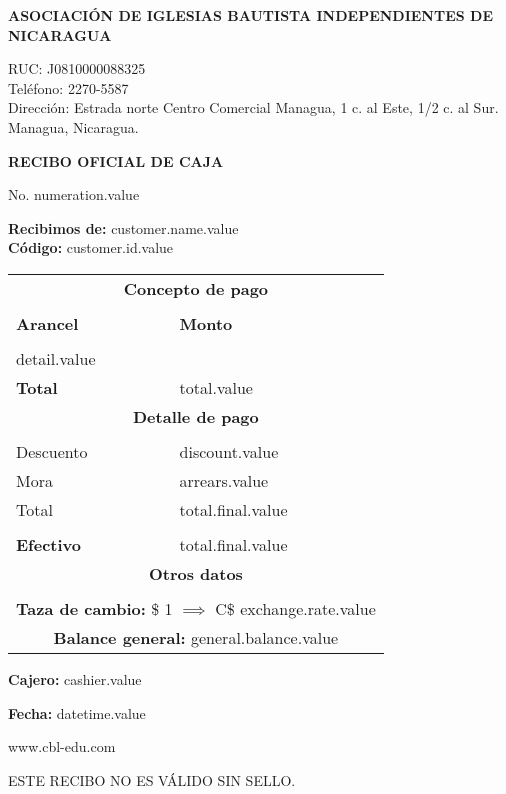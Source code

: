 \documentclass[11pt]{article}
\newcommand{\thenumber}{numeration.value}
\newcommand{\customerName}{customer.name.value}
\newcommand{\customerId}{customer.id.value}
\newcommand{\detail}{detail.value}
\newcommand{\total}{total.value}
\newcommand{\discountTotal}{discount.value}
\newcommand{\arrearsTotal}{arrears.value}
\newcommand{\finalTotal}{total.final.value}
\newcommand{\cashier}{cashier.value}
\newcommand{\datetime}{datetime.value}
\newcommand{\exchangeRate}{exchange.rate.value}
\newcommand{\generalBalance}{general.balance.value}
\begin{document}
    \begin{center}
        \textbf{ASOCIACIÓN DE IGLESIAS BAUTISTA INDEPENDIENTES DE NICARAGUA}\par
        {
            \small
            RUC: J0810000088325\\
            Teléfono: 2270-5587\\
            Dirección: Estrada norte Centro Comercial Managua, 1 c. al Este, 1/2 c. al Sur. Managua, Nicaragua.\par
        }
        \textbf{RECIBO OFICIAL DE CAJA}\par
        No. \thenumber
    \end{center}
    \textbf{Recibimos de:} \customerName\\
    \textbf{Código:} \customerId

    \begin{longtable}{p{3.8cm} p{1.8cm}}
        \hline
        \multicolumn{2}{c}{\textbf{Concepto de pago}} \\\\
        \textbf{Arancel} & \textbf{Monto} \\\\
        \detail\\
        \textbf{Total} & \total\\
        \hline
        \multicolumn{2}{c}{\textbf{Detalle de pago}} \\\\
        Descuento & \discountTotal\\
        Mora & \arrearsTotal\\
        Total & \finalTotal\\\\
        \textbf{Efectivo} & \finalTotal\\
        \hline
        \multicolumn{2}{c}{\textbf{Otros datos}}\\\\
        \multicolumn{2}{c}{\textbf{Taza de cambio:} \$ 1 $\implies$ C\$ \exchangeRate}\\
        \multicolumn{2}{c}{\textbf{Balance general:} \generalBalance}
    \end{longtable}
    
    \textbf{Cajero:} \cashier\par
    \textbf{Fecha:} \datetime
    \begin{center}
        www.cbl-edu.com\par
        ESTE RECIBO NO ES VÁLIDO SIN SELLO.
    \end{center}
\end{document}

